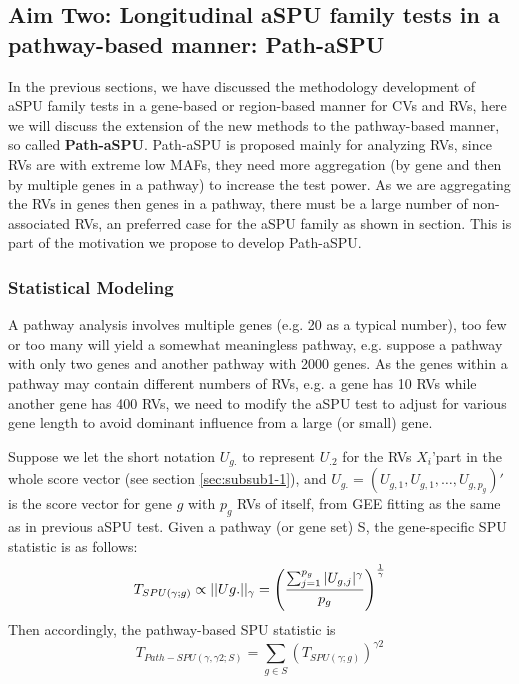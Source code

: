 \documentclass[12pt]{article}
\begin{document}
\subsection{Aim Two: Longitudinal aSPU family tests in a pathway-based manner: Path-aSPU}
\label{sec:aim2}
In the previous sections, we have discussed the methodology development of aSPU family tests in a gene-based or region-based manner for CVs and RVs, here we will discuss the extension of the new methods to the pathway-based manner, so called \textbf{Path-aSPU}. Path-aSPU is proposed mainly for analyzing RVs, since RVs are with extreme low MAFs, they need more aggregation (by gene and then by multiple genes in a pathway) to increase the test power. As we are aggregating the RVs in genes then genes in a pathway, there must be a large number of non-associated RVs, an preferred case for the aSPU family as shown in section. This is part of the motivation we propose to develop Path-aSPU. 
\subsubsection{Statistical Modeling}\label{sec:aim2-1}
A pathway analysis involves multiple genes (e.g. 20 as a typical number), too few or too many will yield a somewhat meaningless pathway, e.g. suppose a pathway with only two genes and another pathway with 2000 genes. As the genes within a pathway may contain different numbers of RVs, e.g. a gene has 10 RVs while another gene has 400 RVs, we need to modify the aSPU test to adjust for various gene length to avoid dominant influence from a large (or small) gene.

Suppose we let the short notation $U_{g.}$ to represent $U_{.2}$ for the RVs $X_i$'part in the whole score vector (see section \ref{sec:subsub1-1}), and $U_{g.} = (U_{g,1},U_{g,1},\ldots, U_{g,p_g})'$ is the score vector for gene $g$ with $p_g$ RVs of itself, from GEE fitting as the same as in previous aSPU test. Given a pathway (or gene set) S, the gene-specific SPU statistic is as follows:
\begin{equation}
T_ { SPU(\gamma ; g) } \propto || Ug.||_{\gamma} =  \left( \frac{  \sum_{j=1} ^ {p_g} |U_{g, j}| ^ { \gamma }  }{p_g} \right) ^ { 1 \over \gamma }
\end{equation}  
Then accordingly, the pathway-based SPU statistic is
\begin{equation}
T _ { Path-SPU(\gamma, \gamma2 ; S) } = \sum_{g \in S} ( T_ { SPU(\gamma ; g) } ) ^ {\gamma2}
\end{equation}  
\end{document}

